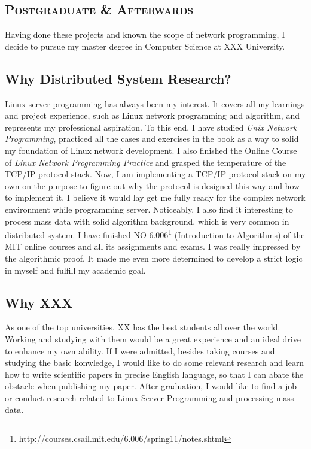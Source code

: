 \documentclass{article}
\begin{document}
\begin{multicols}{2}
		\section{\textsc{Postgraduate \& Afterwards}}
		Having done these projects and known the scope of network programming, I decide to pursue my master degree in Computer Science at XXX University.
		\subsection{Why Distributed System Research?}
		Linux server programming has always been my interest. It covers all my learnings and project experience, such as Linux network programming and algorithm, and represents my professional aspiration. To this end, I have studied \textit{Unix Network Programming}, practiced all the cases and exercises in the book as a way to solid my foundation of Linux network development. I also finished the Online Course of \textit{Linux Network Programming Practice} and grasped the temperature of the TCP/IP protocol stack. Now, I am implementing a TCP/IP protocol stack on my own on the purpose to figure out why the protocol is designed this way and how to implement it. I believe it would lay get me fully ready for the complex network environment while programming server.
		Noticeably, I also find it interesting to process mass data with solid algorithm background, which is very common in distributed system. I have finished NO 6.006\footnote{http://courses.csail.mit.edu/6.006/spring11/notes.shtml} (Introduction to Algorithms) of the MIT online courses and all its assignments and exams. I was really impressed by the algorithmic proof. It made me even more determined to develop a strict logic in myself and fulfill my academic goal.
		\subsection{Why XXX}
		As one of the top universities, XX has the best students all over the world. Working and studying with them would be a great experience and an ideal drive to enhance my own ability.
		If I were admitted, besides taking courses and studying the basic konwledge, I would like to do some relevant research and learn how to write scientific papers in precise English language, so that I can abate the obstacle when publishing my paper.
		After graduation, I would like to find a job or conduct research related to Linux Server Programming and processing mass data.
	\end{multicols}
\end{document}
